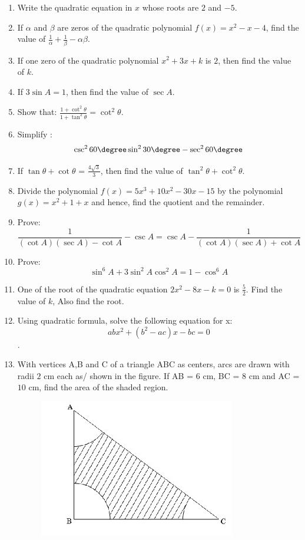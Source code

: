 \begin{enumerate}
	\item Write the quadratic equation in $x$ whose roots are $2$ and $-5$.
		\item If $\alpha$ and $\beta$ are zeros of the quadratic polynomial $f(x) = x^2 - x - 4$, find the value of $\frac{1}{\alpha} + \frac{1}{\beta} - {\alpha \beta}$.
		\item If one zero of the quadratic polynomial $x^{2} + 3x + k$ is $2$, then find the value of $k$.
		\item If $3\sin A = 1$, then find the value of $\sec A$.
		\item Show that: $\frac{1 + \cot^2{\theta}}{1 + \tan^2{\theta}} = \cot^2{\theta}$.
\item Simplify :$${\csc^{2}{60\degree} \sin^{2}{30\degree} - \sec^{2}{60\degree}}$$
	\item If $\tan{\theta} + \cot{\theta}$ = $\frac{4 \sqrt{3}}{3}$, then find the value of $\tan^{2}{\theta} + \cot^{2}{\theta}$. 
	\item Divide the polynomial $f(x) = 5x^{3} + 10x^{2} - 30{x} - 15$ by the polynomial $g(x) = x^{2} + 1 + x$ and hence, find the quotient and the remainder.
		\item Prove:$$\frac{1}{(\cot A)(\sec A) - \cot A} - \csc A = \csc A - \frac{1}{(\cot A)(\sec A) + \cot A}$$
		\item Prove:$$\sin^{6} A + 3\sin^{2} A \cos^{2} A = 1 - \cos^{6}  A$$
		\item One of the root of the quadratic equation $2x^{2} - 8x - k = 0$ is $\frac{5}{2}$. Find the value of $k$, Also find the root.
		\item Using quadratic formula, solve the following equation for x:$$abx^{2} + (b^{2} - ac)x - bc = 0$$.
	\item With vertices A,B and C of a triangle ABC as centers, arcs are drawn with radii $2$ cm each as/ shown in the figure. If AB = $6$ cm, BC = $8$ cm and AC = $10$ cm, find the area of the shaded region.	  	
	\begin{figure}[h]
	      			\centering
	      			\includegraphics[width=\columnwidth]{figs/triashaded.jpg}

\end{figure}
\end{enumerate}
